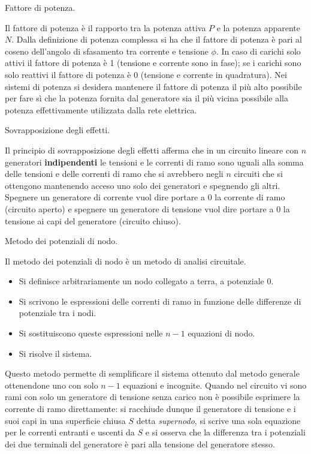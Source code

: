 \documentclass[answers, a4paper,12pt]{exam}
\begin{document}
\begin{questions}
	\question
	Fattore di potenza.
	\begin{solution}Il fattore di potenza è il rapporto tra la potenza attiva $P$ e la potenza apparente $N$. Dalla definizione di potenza complessa si ha che il fattore di potenza è pari al coseno dell'angolo di sfasamento tra corrente e tensione $\phi$. In caso di carichi solo attivi il fattore di potenza è 1 (tensione e corrente sono in fase); se i carichi sono solo reattivi il fattore di potenza è 0 (tensione e corrente in quadratura). Nei sistemi di potenza si desidera mantenere il fattore di potenza il più alto possibile per fare sì che la potenza fornita dal generatore sia il più vicina possibile alla potenza effettivamente utilizzata dalla rete elettrica.\end{solution}
	\question
	Sovrapposizione degli effetti.
	\begin{solution}Il principio di sovrapposizione degli effetti afferma che in un circuito lineare con $n$ generatori \textbf{indipendenti} le tensioni e le correnti di ramo sono uguali alla somma delle tensioni e delle correnti di ramo che si avrebbero negli $n$ circuiti che si ottengono mantenendo acceso uno solo dei generatori e spegnendo gli altri. Spegnere un generatore di corrente vuol dire portare a 0 la corrente di ramo (circuito aperto) e spegnere un generatore di tensione vuol dire portare a 0 la tensione ai capi del generatore (circuito chiuso).\end{solution}
			\pagebreak
	\question
	Metodo dei potenziali di nodo.
	\begin{solution}Il metodo dei potenziali di nodo è un metodo di analisi circuitale.
	\begin{itemize}
		\item Si definisce arbitrariamente un nodo collegato a terra, a potenziale 0.
\item 		Si scrivono le espressioni delle correnti di ramo in funzione delle differenze di potenziale tra i nodi.
\item Si sostituiscono queste espressioni nelle $n - 1$ equazioni di nodo. 
\item Si risolve il sistema.
\end{itemize}
Questo metodo permette di semplificare il sistema ottenuto dal metodo generale ottenendone uno con solo $n - 1$ equazioni e incognite. Quando nel circuito vi sono rami con solo un generatore di tensione senza carico non è possibile esprimere la corrente di ramo direttamente: si racchiude dunque il generatore di tensione e i suoi capi in una superficie chiusa $S$ detta \textit{supernodo}, si scrive una sola equazione per le correnti entranti e uscenti da $S$ e si osserva che la differenza tra i potenziali dei due terminali del generatore è pari alla tensione del generatore stesso. \end{solution}

\end{questions}
\end{document}
